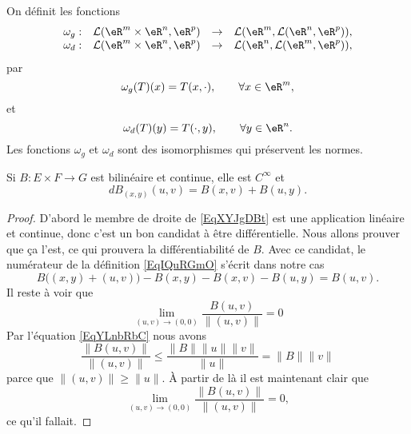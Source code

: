 \begin{proposition}\label{isom_isom}
  On définit les fonctions
  \begin{equation}
    \begin{array}{rccc}
      \omega_g: & \mathcal{L}(\eR^{m}\times\eR^{n}, \eR^p)&\to &\mathcal{L}(\eR^{m}, \mathcal{L}(\eR^{n}, \eR^p)),\\
      \omega_d: & \mathcal{L}(\eR^{m}\times\eR^{n}, \eR^p)&\to &\mathcal{L}(\eR^{n}, \mathcal{L}(\eR^{m}, \eR^p)),
    \end{array}
  \end{equation}
par 
\[
\omega_g(T)(x)=T(x,\cdot), \qquad \forall x\in\eR^m,
\]
et
\[
\omega_d(T)(y)=T(\cdot, y), \qquad \forall y\in\eR^n.
\]
Les fonctions $\omega_g$ et $\omega_d$ sont des isomorphismes qui préservent les normes.    
\end{proposition}

\begin{lemma}\label{LemFRdNDCd}
    Si \( B\colon E\times F\to G\) est bilinéaire et continue, elle est \(  C^{\infty}\) et
    \begin{equation}    \label{EqXYJgDBt}
        dB_{(x,y)}(u,v)=B(x,v)+B(u,y).
    \end{equation}
\end{lemma}

\begin{proof}
    D'abord le membre de droite de \eqref{EqXYJgDBt} est une application linéaire et continue, donc c'est un bon candidat à être différentielle. Nous allons prouver que ça l'est, ce qui prouvera la différentiabilité de \( B\). Avec ce candidat, le numérateur de la définition \eqref{EqIQuRGmO} s'écrit dans notre cas
    \begin{equation}
        B\big( (x,y)+(u,v) \big)-B(x,y)-B(x,v)-B(u,y)=B(u,v).
    \end{equation}
    Il reste à voir que 
    \begin{equation}
        \lim_{ (u,v)\to (0,0) } \frac{ B(u,v) }{ \| (u,v) \| }=0
    \end{equation}
    Par l'équation \eqref{EqYLnbRbC} nous avons
    \begin{equation}
        \frac{ \| B(u,v) \| }{ \| (u,v) \| }\leq \frac{ \| B \|\| u \|\| v \| }{ \| u \| }=\| B \|\| v \|
    \end{equation}
    parce que \( \| (u,v) \|\geq \| u \|\). À partir de là il est maintenant clair que
    \begin{equation}
        \lim_{(u,v)\to (0,0)}\frac{ \| B(u,v) \| }{ \| (u,v) \| }=0,
    \end{equation}
    ce qu'il fallait.
\end{proof}

